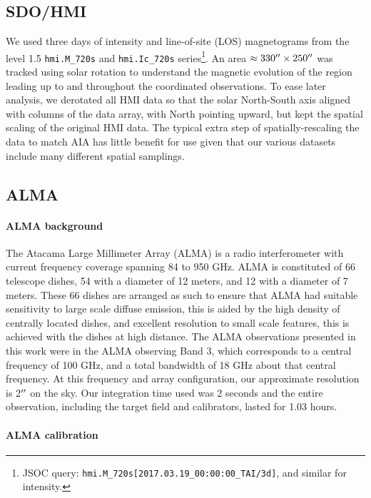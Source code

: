 \documentclass[twocolumn]{aastex62}
\begin{document}
\subsection{SDO/HMI}
We used three days of intensity and line-of-site (LOS) magnetograms from the level 1.5 \texttt{hmi.M\_720s} and \texttt{hmi.Ic\_720s} series\footnote{JSOC query: \texttt{hmi.M\_720s[2017.03.19\_00:00:00\_TAI/3d]}, and similar for intensity.}.  
An area $\approx330\mbox{$^{\prime\prime}$}{}\times250\mbox{$^{\prime\prime}$}{}$ was tracked using solar rotation to understand the magnetic evolution of the region leading up to and throughout the coordinated observations.  
To ease later analysis, we derotated all HMI data so that the solar North-South axis aligned with columns of the data array, with North pointing upward, but kept the spatial scaling of the original HMI data.  
The typical extra step of spatially-rescaling the data to match AIA  has little benefit for use given that our various datasets include many different spatial samplings.

\subsection{ALMA}
\paragraph{ALMA background} The Atacama Large Millimeter Array (ALMA) is a radio interferometer with current frequency coverage spanning 84 to 950 GHz. ALMA is constituted of 66 telescope dishes, 54 with a diameter of 12 meters, and 12 with a diameter of 7 meters. These 66 dishes are arranged as such to ensure that ALMA had suitable sensitivity to large scale diffuse emission, this is aided by the high density of centrally located dishes, and excellent resolution to small scale features, this is achieved with the dishes at high distance. The ALMA observations presented in this work were in the ALMA observing Band 3, which corresponds to a central frequency of 100 GHz, and a total bandwidth of 18 GHz about that central frequency. At this frequency and array configuration, our approximate resolution is 2$\mbox{$^{\prime\prime}$}$ on the sky. Our integration time used was 2 seconds and the entire observation, including the target field and calibrators, lasted for 1.03 hours. 

\paragraph{ALMA calibration}
\end{document}
